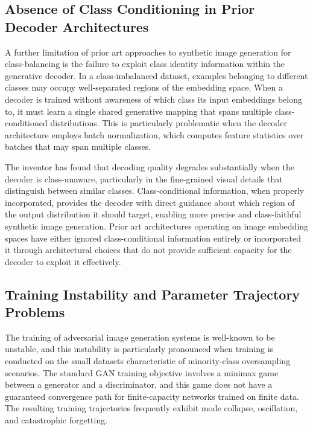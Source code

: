 \documentclass[12pt,letterpaper]{article}
\begin{document}
\subsection{Absence of Class Conditioning in Prior Decoder Architectures}

A further limitation of prior art approaches to synthetic image generation for
class-balancing is the failure to exploit class identity information within the
generative decoder. In a class-imbalanced dataset, examples belonging to
different classes may occupy well-separated regions of the embedding space.
When a decoder is trained without awareness of which class its input embeddings
belong to, it must learn a single shared generative mapping that spans multiple
class-conditioned distributions. This is particularly problematic when the
decoder architecture employs batch normalization, which computes feature
statistics over batches that may span multiple classes.

The inventor has found that decoding quality degrades substantially when the
decoder is class-unaware, particularly in the fine-grained visual details that
distinguish between similar classes. Class-conditional information, when
properly incorporated, provides the decoder with direct guidance about which
region of the output distribution it should target, enabling more precise and
class-faithful synthetic image generation. Prior art architectures operating on
image embedding spaces have either ignored class-conditional information
entirely or incorporated it through architectural choices that do not provide
sufficient capacity for the decoder to exploit it effectively.

\subsection{Training Instability and Parameter Trajectory Problems}

The training of adversarial image generation systems is well-known to be
unstable, and this instability is particularly pronounced when training is
conducted on the small datasets characteristic of minority-class oversampling
scenarios. The standard GAN training objective involves a minimax game between
a generator and a discriminator, and this game does not have a guaranteed
convergence path for finite-capacity networks trained on finite data. The
resulting training trajectories frequently exhibit mode collapse, oscillation,
and catastrophic forgetting.
\end{document}
